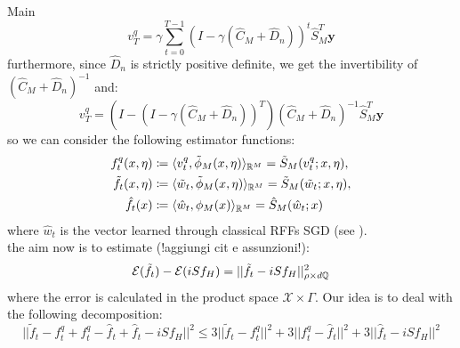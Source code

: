 \begin{chapter}{Main}
 $$
     v_T^q = \gamma \sum_{t=0}^{T-1} (I - \gamma (\hat{C}_M + \hat{D}_n))^t \hat{S}_M^T \mathbf{y}
 $$
 furthermore, since $\hat{D}_n$ is strictly positive definite, we get the invertibility of $(\hat{C}_M + \hat{D}_n)^{-1}$ and:
 $$
     v_T^q = \left(I - (I - \gamma (\hat{C}_M + \hat{D}_n))^T\right) (\hat{C}_M + \hat{D}_n)^{-1} \hat{S}_M^T \mathbf{y}
 $$
 so we can consider the following estimator functions:
 \begin{align*}
     f_t^q(x,\eta)        & \coloneqq \langle v_t^q, \tilde{\phi}_M(x, \eta) \rangle_{\mathbb{R}^M} = \tilde{S}_M(v_t^q; x, \eta),         \\
     \tilde{f}_t(x, \eta) & \coloneqq \langle \tilde{w}_t, \tilde{\phi}_M(x, \eta) \rangle_{\mathbb{R}^M} = \tilde{S}_M(\tilde{w}_t; x, \eta), \\
     \hat{f}_t(x)         & \coloneqq \langle \hat{w}_t, \phi_M(x) \rangle_{\mathbb{R}^M} = \hat{S}_M(\hat{w}_t; x)
 \end{align*}
 where $\hat{w}_t$ is the vector learned through classical RFFs SGD (see \cite{SGDlearning}).
 \\ the aim now is to estimate (!aggiungi cit e assunzioni!):
 $$
     \mathcal{E}(\tilde{f}_t)-\mathcal{E}(iSf_H) = ||\tilde{f}_t - iSf_H||_{\rho\times d\mathbb{Q}}^2
 $$
 where the error is calculated in the product space $\mathcal{X} \times \Gamma$.
 Our idea is to deal with the following decomposition:
 $$
     ||\tilde{f}_t - f_t^q + f_t^q - \hat{f}_t + \hat{f}_t - iSf_H||^2\leq 3||\tilde{f}_t - f_t^q||^2 + 3||f_t^q - \hat{f}_t||^2 + 3||\hat{f}_t - iSf_H||^2
 $$
\end{chapter}



